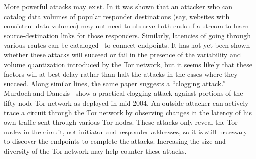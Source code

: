 \documentclass{llncs}
\begin{document}
More powerful attacks may exist. In \cite{hintz-pet02} it was
shown that an attacker who can catalog data volumes of popular
responder destinations (say, websites with consistent data volumes) may not
need to
observe both ends of a stream to learn source-destination links for those
responders.
Similarly, latencies of going through various routes can be
cataloged~\cite{back01} to connect endpoints.
It has not yet been shown whether these attacks will succeed or fail
in the presence of the variability and volume quantization introduced by the
Tor network, but it seems likely that these factors will at best delay
rather than halt the attacks in the cases where they succeed.
Along similar lines, the same paper suggests a ``clogging
attack.'' Murdoch and Danezis~\cite{attack-tor-oak05} show a practical
clogging attack against portions of
the fifty node Tor network as deployed in mid 2004.
An outside attacker can actively trace a circuit through the Tor network
by observing changes in the latency of his
own traffic sent through various Tor nodes. These attacks only reveal
the Tor nodes in the circuit, not initiator and responder addresses,
so it is still necessary to discover the endpoints to complete the
attacks. Increasing the size and diversity of the Tor network may
help counter these attacks.

%
\end{document}

